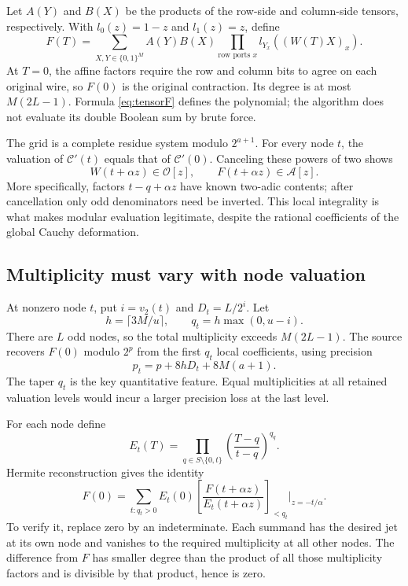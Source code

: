 \documentclass[11pt,a4paper]{article}
\numberwithin{equation}{section}
\theoremstyle{definition}
\theoremstyle{remark}
\begin{document}
Let $A(Y)$ and $B(X)$ be the products of the row-side and column-side tensors,
respectively. With $l_0(z)=1-z$ and $l_1(z)=z$, define
\begin{equation}\label{eq:tensorF}
 F(T)=\sum_{X,Y\in\{0,1\}^M}A(Y)B(X)
       \prod_{\text{row ports }x}l_{Y_x}((W(T)X)_x).
\end{equation}
At $T=0$, the affine factors require the row and column bits to agree on
each original wire, so $F(0)$ is the original contraction. Its degree is at
most $M(2L-1)$. Formula \eqref{eq:tensorF} defines the polynomial; the
algorithm does not evaluate its double Boolean sum by brute force.

The grid is a complete residue system modulo $2^{a+1}$. For every node $t$,
the valuation of $\mathcal C'(t)$ equals that of $\mathcal C'(0)$.
Canceling these powers of two shows
\[
 W(t+\alpha z)\in\mathcal O[z],\qquad F(t+\alpha z)\in\mathcal A[z].
\]
More specifically, factors $t-q+\alpha z$ have known two-adic contents;
after cancellation only odd denominators need be inverted. This local
integrality is what makes modular evaluation legitimate, despite the rational
coefficients of the global Cauchy deformation.

\subsection{Multiplicity must vary with node valuation}
At nonzero node $t$, put $i=v_2(t)$ and $D_t=L/2^i$. Let
\[
 h=\lceil3M/u\rceil,\qquad q_t=h\max(0,u-i).
\]
There are $L$ odd nodes, so the total multiplicity exceeds $M(2L-1)$.
The source recovers $F(0)$ modulo $2^p$ from the first $q_t$ local
coefficients, using precision
\begin{equation}\label{eq:precision}
 p_t=p+8hD_t+8M(a+1).
\end{equation}
The taper $q_t$ is the key quantitative feature. Equal multiplicities at all
retained valuation levels would incur a larger precision loss at the last
level.

For each node define
\[
 E_t(T)=\prod_{q\in S\setminus\{0,t\}}
            \left(\frac{T-q}{t-q}\right)^{q_q}.
\]
Hermite reconstruction gives the identity
\begin{equation}\label{eq:taperidentity}
 F(0)=\sum_{t:q_t>0}E_t(0)
 \left[\frac{F(t+\alpha z)}{E_t(t+\alpha z)}\right]_{<q_t}
                  \bigg|_{z=-t/\alpha}.
\end{equation}
To verify it, replace zero by an indeterminate. Each summand has the desired
jet at its own node and vanishes to the required multiplicity at all other
nodes. The difference from $F$ has smaller degree than the product of all
those multiplicity factors and is divisible by that product, hence is zero.
\end{document}
